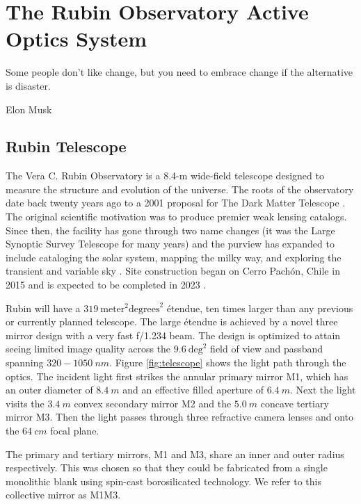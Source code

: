 \chapter{The Rubin Observatory Active Optics System}
\label{chap:aos}

\epigraph{Some people don't like change, but you need to embrace change if the alternative is disaster.}{Elon Musk}

\section{Rubin Telescope}
The Vera C. Rubin Observatory is a 8.4-m wide-field telescope designed to measure the structure and evolution of the universe. The roots of the observatory date back twenty years ago to a 2001 proposal for The Dark Matter Telescope \cite{2001ASPC..237..417T}. The original scientific motivation was to produce premier weak lensing catalogs. Since then, the facility has gone through two name changes (it was the Large Synoptic Survey Telescope for many years) and the purview has expanded to include cataloging the solar system, mapping the milky way, and exploring the transient and variable sky \cite{sciencebook}. Site construction began on Cerro Pach\'{o}n, Chile in 2015 and is expected to be completed in 2023 \cite{2020SPIE11445E..0IT, 2020SPIE11445E..1US}. 

Rubin will have a $319\ \text{meter}^2\text{degrees}^2$ \'{e}tendue, ten times larger than any previous or currently planned telescope. The large \'{e}tendue is achieved by a novel three mirror design with a very fast f/1.234 beam. The design is optimized to attain seeing limited image quality across the $9.6\ \text{deg}^2$ field of view and passband spanning $320-1050\ nm$. Figure \ref{fig:telescope} shows the light path through the optics. The incident light first strikes the annular primary mirror M1, which has an outer diameter of $8.4\ m$ and an effective filled aperture of $6.4\ m$. Next the light visits the $3.4\ m$ convex secondary mirror M2 and the $5.0\ m$ concave tertiary mirror M3. Then the light passes through three refractive camera lenses and onto the $64\ cm$ focal plane. 

The primary and tertiary mirrors, M1 and M3, share an inner and outer radius respectively. This was chosen so that they could be fabricated from a single monolithic blank using spin-cast borosilicated technology. We refer to this collective mirror as M1M3. 


